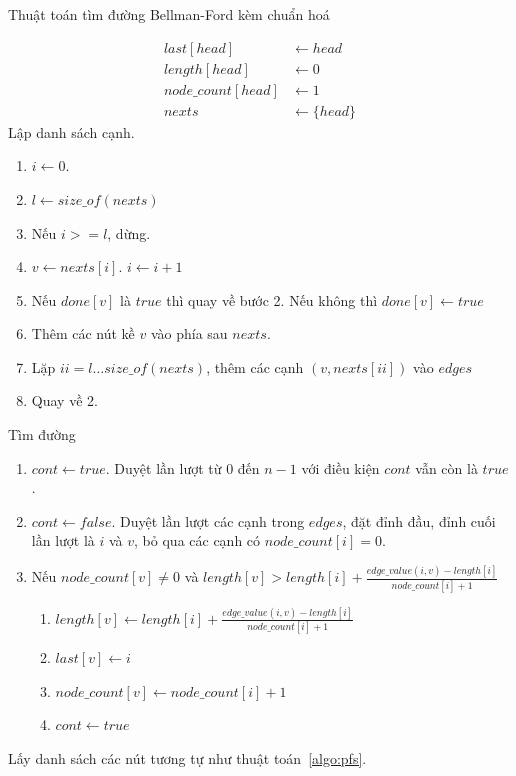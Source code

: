 \documentclass[a4paper,oneside,14pt]{extbook} %
\begin{document}
\begin{algo}
  \caption{Thuật toán tìm đường Bellman-Ford kèm chuẩn hoá}
  \label{algo:bellman}
  \begin{align*}
    last[head] &\leftarrow head\\
    length[head] &\leftarrow 0\\
    node\_count[head] &\leftarrow 1\\
    nexts &\leftarrow \{head\}
  \end{align*}
Lập danh sách cạnh.
  \begin{enumerate}
  \item $i \leftarrow 0$.
  \item $l \leftarrow size\_of(nexts)$
  \item Nếu $i >= l$, dừng.
  \item $v \leftarrow nexts[i]$. $i \leftarrow i+1$
  \item Nếu $done[v]$ là $true$ thì quay về bước 2. Nếu không thì
    $done[v] \leftarrow true$
  \item Thêm các nút kề $v$ vào phía sau $nexts$.
  \item Lặp $ii = l\ldots size\_of(nexts)$, thêm các cạnh
    $(v,nexts[ii])$ vào $edges$
  \item Quay về 2.
  \end{enumerate}
Tìm đường
\begin{enumerate}
\item $cont \leftarrow true$. Duyệt lần lượt từ $0$ đến $n-1$ với điều kiện
  $cont$ vẫn còn là $true$.
\item $cont \leftarrow false$. Duyệt lần lượt các cạnh trong $edges$, đặt đỉnh đầu, đỉnh cuối
  lần lượt là $i$ và $v$, bỏ qua các cạnh có $node\_count[i] = 0$.
\item Nếu $node\_count[v] \ne 0$ và $length[v] > length[i] +
  \frac{edge\_value(i,v)-length[i]}{node\_count[i]+1}$
  \begin{enumerate}
  \item $length[v] \leftarrow length[i] +
    \frac{edge\_value(i,v)-length[i]}{node\_count[i]+1}$
  \item $last[v] \leftarrow i$
  \item $node\_count[v] \leftarrow node\_count[i]+1$
  \item $cont \leftarrow true$
  \end{enumerate}
\end{enumerate}
Lấy danh sách các nút tương tự như thuật toán~\ref{algo:pfs}.
\end{algo}
\end{document}
